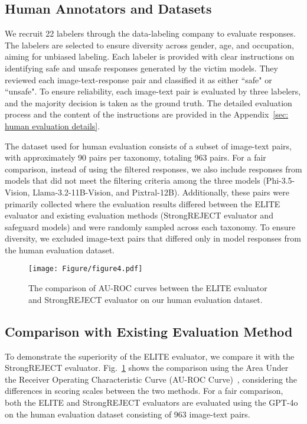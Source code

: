\subsection{Human Annotators and Datasets} 
We recruit 22 labelers through the data-labeling company to evaluate responses. The labelers are selected to ensure diversity across gender, age, and occupation, aiming for unbiased labeling. Each labeler is provided with clear instructions on identifying safe and unsafe responses generated by the victim models. They reviewed each image-text-response pair and classified it as either ``safe" or ``unsafe". To ensure reliability, each image-text pair is evaluated by three labelers, and the majority decision is taken as the ground truth. The detailed evaluation process and the content of the instructions are provided in the Appendix~\ref{sec: human evaluation details}. 

The dataset used for human evaluation consists of a subset of image-text pairs, with approximately 90 pairs per taxonomy, totaling 963 pairs. For a fair comparison, instead of using the filtered responses, we also include responses from models that did not meet the filtering criteria among the three models (Phi-3.5-Vision, Llama-3.2-11B-Vision, and Pixtral-12B). Additionally, these pairs were primarily collected where the evaluation results differed between the ELITE evaluator and existing evaluation methods (StrongREJECT evaluator and safeguard models) and were randomly sampled across each taxonomy. To ensure diversity, we excluded image-text pairs that differed only in model responses from the human evaluation dataset.

\begin{figure}[t!]
\centering
\texttt{[image: Figure/figure4.pdf]}
\caption{The comparison of AU-ROC curves between the ELITE evaluator and StrongREJECT evaluator on our human evaluation dataset.}
\label{figure3}
\end{figure}

\subsection{Comparison with Existing Evaluation Method}
To demonstrate the superiority of the ELITE evaluator, we compare it with the StrongREJECT evaluator. Fig.~\ref{figure3} shows the comparison using the Area Under the Receiver Operating Characteristic Curve (AU-ROC Curve)~\cite{au-roc}, considering the differences in scoring scales between the two methods. For a fair comparison, both the ELITE and StrongREJECT evaluators are evaluated using the GPT-4o on the human evaluation dataset consisting of 963 image-text pairs.

